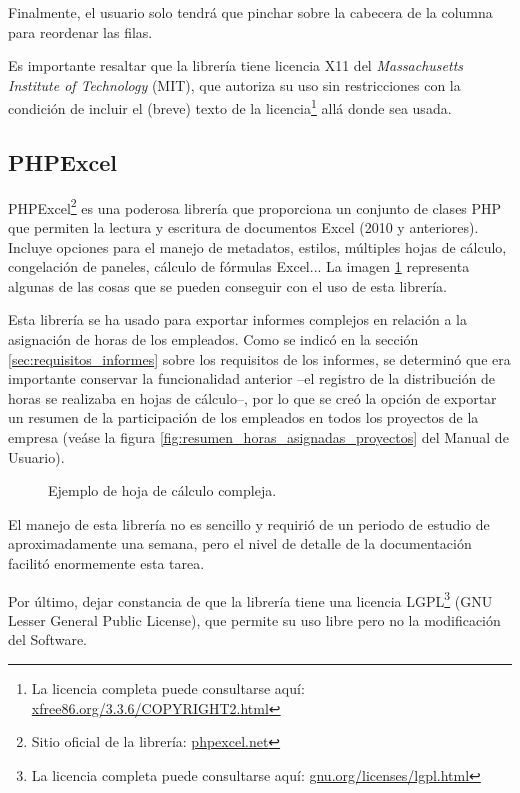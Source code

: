 Finalmente, el usuario solo tendrá que pinchar sobre la cabecera de la columna
para reordenar las filas.

Es importante resaltar que la librería tiene licencia X11 del
\textit{Massachusetts Institute of Technology }(MIT), que autoriza su uso sin
restricciones con la condición de incluir el (breve) texto de la
licencia\footnote{La licencia completa puede consultarse aquí:
\href{http://www.xfree86.org/3.3.6/COPYRIGHT2.html}{
xfree86.org/3.3.6/COPYRIGHT2.html}} allá donde sea usada.

\subsection{PHPExcel}

PHPExcel\footnote{Sitio oficial de la librería:
\href{http://www.phpexcel.net}{
phpexcel.net}} es una poderosa librería que
proporciona un conjunto de clases PHP que permiten la lectura y escritura de
documentos Excel (2010 y anteriores). Incluye opciones para el manejo de
metadatos, estilos, múltiples hojas de cálculo, congelación de paneles, cálculo
de fórmulas Excel... La imagen \ref{fig:ejemplo_PHPExcel} representa algunas de
las cosas que se pueden conseguir con el uso de esta librería.

Esta librería se ha usado para exportar informes complejos en relación a la
asignación de horas de los empleados. Como se indicó en la sección
\ref{sec:requisitos_informes} sobre los requisitos de los informes, se
determinó que era importante conservar la funcionalidad anterior --el registro
de la distribución de horas se realizaba en hojas de cálculo--, por lo que se
creó la opción de exportar un resumen de la participación de los empleados en
todos los proyectos de la empresa (veáse la figura
\ref{fig:resumen_horas_asignadas_proyectos} del Manual de Usuario).

\begin{figure}
\centering
{}
\caption{Ejemplo de hoja de cálculo compleja.}
\label{fig:ejemplo_PHPExcel}
\end{figure}

El manejo de esta librería no es sencillo y requirió de un periodo de estudio
de aproximadamente una semana, pero el nivel de detalle de la documentación
facilitó enormemente esta tarea.

Por último, dejar constancia de que la librería tiene una licencia
LGPL\footnote{La licencia completa puede consultarse aquí:
\href{http://www.gnu.org/licenses/lgpl.html}{
gnu.org/licenses/lgpl.html}} (GNU
Lesser General Public License), que permite su uso libre pero no la
modificación del Software.

